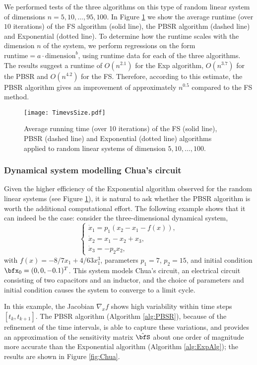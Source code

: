 \documentclass[DIV=12]{scrartcl} %
\theoremstyle{definition}
\begin{document}
We performed tests of the three algorithms on this type of random linear system of dimensions $n=5,10,\dots,95,100$. In Figure \ref{fig:TimevsSize} we show the average runtime (over $10$ iterations) of the FS algorithm (solid line), the PBSR algorithm (dashed line) and Exponential (dotted line). 
To determine how the runtime scales with the dimension $n$ of the system, we perform regressions on the form $\text{runtime} = a\cdot\text{dimension}^b$, using runtime data for each of the three algorithms. The results suggest a runtime of $O(n^{2.1})$ for the Exp algorithm, $O(n^{3.7})$ for the PBSR and $O(n^{4.2})$ for the FS. Therefore, according to this estimate, the PBSR algorithm gives an improvement of approximately $n ^{0.5}$ compared to the FS method.


\begin{figure}
    \centering
    \texttt{[image: TimevsSize.pdf]}
    \caption{Average running time (over 10 iterations) of the FS (solid line), PBSR (dashed line) and Exponential (dotted line) algorithms applied to random linear systems of dimension $5,10,\dots,100$.}
    \label{fig:TimevsSize}
\end{figure}

\subsubsection*{Dynamical system modelling Chua's circuit}
Given the higher efficiency of the Exponential algorithm observed for the random linear systems (see Figure \ref{fig:TimevsSize}), it is natural to ask whether the PBSR algorithm is worth the additional computational effort. The following example shows that it can indeed be the case: consider the three-dimensional dynamical system,
\begin{equation*}
    \begin{cases}
    \dot{x}_1 = p_1(x_2 - x_1 - f(x)),\\
    \dot{x}_2 = x_1 - x_2 + x_3,\\
    \dot{x}_3 = -p_2x_2,
    \end{cases}
\end{equation*}
with $f(x) = -8/7x_1+4/63 x_1^3$, parameters $p_1 = 7$, $p_2 = 15$, and initial condition $\bfx_0 = (0,0,-0.1)^T$. 
This system models Chua's circuit, an electrical circuit consisting of two capacitors and an inductor, and the choice of parameters and initial condition causes the system to converge to a limit cycle.

In this example, the Jacobian $\nabla_xf$ shows high variability within time steps $[t_k,t_{k+1}]$. The PBSR algorithm (Algorithm \ref{alg:PBSR}), because of the refinement of the time intervals, is able to capture these variations, and provides an approximation of the sensitivity matrix $\hat{\bfS}$ about one order of magnitude more accurate than the Exponential algorithm (Algorithm \ref{alg:ExpAlg}); the results are shown in Figure \ref{fig:Chua}. 
\end{document}
